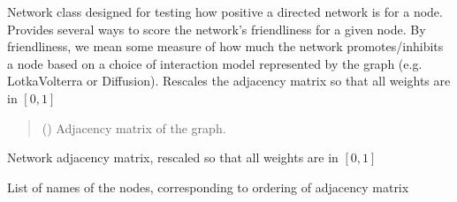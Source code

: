 \documentclass[letterpaper,10pt,english]{sphinxmanual}
\begin{document}
\begin{fulllineitems}
\label{\detokenize{friendlynets:friendlyNet.friendlyNet}}
\pysigstartsignatures
{}
\pysigstopsignatures
\sphinxAtStartPar
Network class designed for testing how positive a directed network is for a node. Provides several ways to score the network’s friendliness for a given node. By friendliness,
we mean some measure of how much the network promotes/inhibits a node based on a choice of interaction model represented by the graph (e.g. Lotka\sphinxhyphen{}Volterra or Diffusion).
Rescales the adjacency matrix so that all weights are in \([0,1]\)
\begin{quote}\begin{description}
\sphinxAtStartPar
{} (\sphinxstyleliteralemphasis{\sphinxupquote{(}}\sphinxstyleliteralemphasis{\sphinxupquote{,}}\sphinxstyleliteralemphasis{\sphinxupquote{) }}\sphinxstyleliteralemphasis{\sphinxupquote{{[}}}\sphinxstyleliteralemphasis{\sphinxupquote{{]}}}) \textendash{} Adjacency matrix of the graph.

\end{description}\end{quote}

\begin{fulllineitems}
\label{\detokenize{friendlynets:friendlyNet.friendlyNet.Adjacency}}
\pysigstartsignatures
{}
\pysigstopsignatures
\sphinxAtStartPar
Network adjacency matrix, rescaled so that all weights are in \([0,1]\)

\end{fulllineitems}


\begin{fulllineitems}
\label{\detokenize{friendlynets:friendlyNet.friendlyNet.NodeNames}}
\pysigstartsignatures
{}
\pysigstopsignatures
\sphinxAtStartPar
List of names of the nodes, corresponding to ordering of adjacency matrix


\end{fulllineitems}
\end{fulllineitems}
\end{document}
